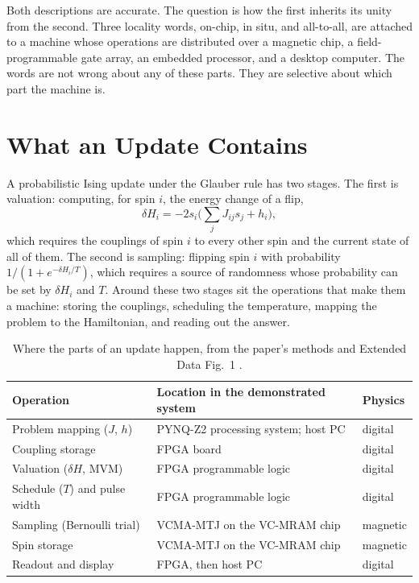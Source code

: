 \documentclass[11pt]{article}
\theoremstyle{definition}
\theoremstyle{remark}
\begin{document}
Both descriptions are accurate. The question is how the first inherits its unity from the second. Three locality words, on-chip, in situ, and all-to-all, are attached to a machine whose operations are distributed over a magnetic chip, a field-programmable gate array, an embedded processor, and a desktop computer. The words are not wrong about any of these parts. They are selective about which part the machine is.

\section{What an Update Contains}

A probabilistic Ising update under the Glauber rule has two stages. The first is valuation: computing, for spin $i$, the energy change of a flip,
\begin{equation}
\delta H_i = -2 s_i \Big( \sum_j J_{ij} s_j + h_i \Big),
\end{equation}
which requires the couplings of spin $i$ to every other spin and the current state of all of them. The second is sampling: flipping spin $i$ with probability $1/(1 + e^{-\delta H_i / T})$, which requires a source of randomness whose probability can be set by $\delta H_i$ and $T$. Around these two stages sit the operations that make them a machine: storing the couplings, scheduling the temperature, mapping the problem to the Hamiltonian, and reading out the answer.

\begin{table}[h]
\centering
\small
\begin{tabular}{lll}
\toprule
Operation & Location in the demonstrated system & Physics \\
\midrule
Problem mapping ($J$, $h$) & PYNQ-Z2 processing system; host PC & digital \\
Coupling storage & FPGA board & digital \\
Valuation ($\delta H$, MVM) & FPGA programmable logic & digital \\
Schedule ($T$) and pulse width & FPGA programmable logic & digital \\
Sampling (Bernoulli trial) & VCMA-MTJ on the VC-MRAM chip & magnetic \\
Spin storage & VCMA-MTJ on the VC-MRAM chip & magnetic \\
Readout and display & FPGA, then host PC & digital \\
\bottomrule
\end{tabular}
\caption{Where the parts of an update happen, from the paper's methods and Extended Data Fig.~1 \cite{li2026}.}
\label{tab:locations}
\end{table}
\end{document}

